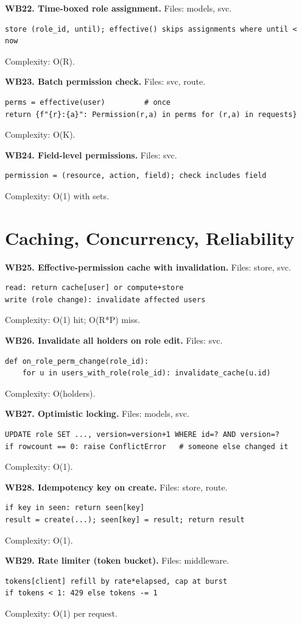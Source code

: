 \documentclass[11pt,a4paper]{report}
\begin{document}
\textbf{WB22. Time-boxed role assignment.} Files: models, svc.
\begin{lstlisting}
store (role_id, until); effective() skips assignments where until < now
\end{lstlisting}
Complexity: O(R).

\textbf{WB23. Batch permission check.} Files: svc, route.
\begin{lstlisting}
perms = effective(user)         # once
return {f"{r}:{a}": Permission(r,a) in perms for (r,a) in requests}
\end{lstlisting}
Complexity: O(K).

\textbf{WB24. Field-level permissions.} Files: svc.
\begin{lstlisting}
permission = (resource, action, field); check includes field
\end{lstlisting}
Complexity: O(1) with sets.

\section{Caching, Concurrency, Reliability}

\textbf{WB25. Effective-permission cache with invalidation.} Files: store, svc.
\begin{lstlisting}
read: return cache[user] or compute+store
write (role change): invalidate affected users
\end{lstlisting}
Complexity: O(1) hit; O(R*P) miss.

\textbf{WB26. Invalidate all holders on role edit.} Files: svc.
\begin{lstlisting}
def on_role_perm_change(role_id):
    for u in users_with_role(role_id): invalidate_cache(u.id)
\end{lstlisting}
Complexity: O(holders).

\textbf{WB27. Optimistic locking.} Files: models, svc.
\begin{lstlisting}
UPDATE role SET ..., version=version+1 WHERE id=? AND version=?
if rowcount == 0: raise ConflictError   # someone else changed it
\end{lstlisting}
Complexity: O(1).

\textbf{WB28. Idempotency key on create.} Files: store, route.
\begin{lstlisting}
if key in seen: return seen[key]
result = create(...); seen[key] = result; return result
\end{lstlisting}
Complexity: O(1).

\textbf{WB29. Rate limiter (token bucket).} Files: middleware.
\begin{lstlisting}
tokens[client] refill by rate*elapsed, cap at burst
if tokens < 1: 429 else tokens -= 1
\end{lstlisting}
Complexity: O(1) per request.
\end{document}

